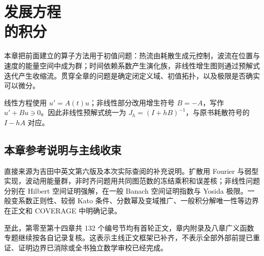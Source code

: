 \chapter[发展方程的积分]{发展方程\\的积分}\label{ch:yosida-14}

本章把前面建立的算子方法用于初值问题：热流由耗散生成元控制，波流在位置与速度的能量空间中成为群；时间依赖系数产生演化族，非线性增生图则通过预解式迭代产生收缩流。贯穿全章的问题是确定闭定义域、初值拓扑，以及极限是否确实可以微分。

线性方程使用 $u'=A(t)u$；非线性部分改用增生符号 $B=-A$，写作 $u'+Bu\ni0$。因此非线性预解式统一为 $J_h=(I+hB)^{-1}$，与原书耗散符号的 $I-hA$ 对应。









\section*{本章参考说明与主线收束}
直接来源为吉田中英文第六版及本次实际查阅的补充说明。扩散用 Fourier 与弱型实现，波动用能量群，非时齐问题用共同图范数的冻结乘积和误差核；非线性问题分别在 Hilbert 空间证明强解，在一般 Banach 空间证明指数与 Yosida 极限。一般变系数正则性、较弱 Kato 条件、分数幂及变域推广、一般积分解唯一性等边界在正文和 COVERAGE 中明确记录。

至此，第零至第十四章共 132 个编号节均有首轮正文，章内附录及八章广义函数专题继续按各自记录复核。这表示主线正文框架已补齐，不表示全部外部前提已重证、证明边界已消除或全书独立数学审校已经完成。
